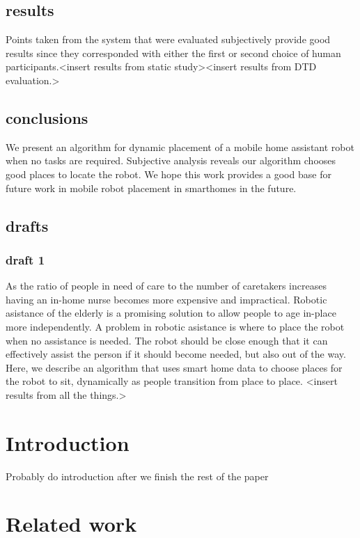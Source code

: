 \documentclass[11pt, conference, a4paper]{IEEEtran}
\begin{document}
\subsection{results}
Points taken from the system that were evaluated subjectively provide good results since they corresponded with either the first or second choice of human participants.\textless insert results from static 
study\textgreater \textless insert results from DTD evaluation.\textgreater

\subsection{conclusions}
We present an algorithm for dynamic placement of a mobile home assistant robot 
when no tasks are required. Subjective analysis reveals our algorithm chooses 
good places to locate the robot. We hope this work provides a good base for 
future work in mobile robot placement in smarthomes in the future.

\subsection{drafts}
\subsubsection{draft 1}
As the ratio of people in need of care to the number of caretakers increases 
having an in-home nurse becomes more expensive and impractical. Robotic 
asistance of the elderly is a promising solution to allow people to age 
in-place more independently. A problem in robotic asistance is where to place 
the robot when no assistance is needed. The robot should be close enough that 
it can effectively assist the person if it should become needed, but also out 
of the way. Here, we describe an algorithm that uses smart home data to choose 
places for the robot to sit, dynamically as people transition from place to 
place. \textless insert results from all the things.\textgreater


\section{Introduction}

Probably do introduction after we finish the rest of the paper

\section{Related work}
\end{document}
